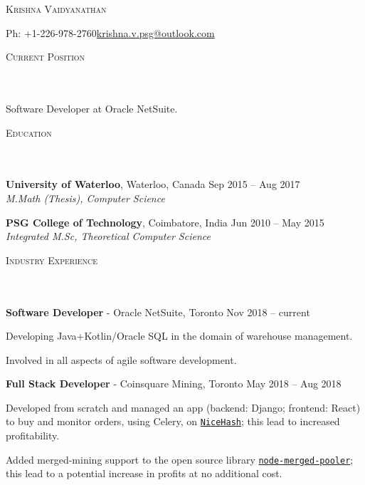 \documentclass{article}
\newcommand{\header}[1]{{
\hspace*{-15pt}\vspace*{6pt} \textsc{#1}} \vspace*{-6pt} 
\lineunder
}
\newcommand{\lineunder}{
\vspace*{-8pt} \\ \hspace*{-18pt} 
\hrulefill \\
}
\newcommand{\content}{
\vspace*{2pt}%
}
\newcommand{\college}[5]{\vspace*{2pt}%
#1 \hfill #2 \\ #3 \hfill #4
\vspace*{5pt}
}
\newcommand{\employer}[4]{{
\vspace*{2pt}%
\textbf{#1} - #2 \hfill #3\\ #4 \vspace*{2pt}}
}
\renewcommand{\labelitemii}{
$\vcenter{\hbox{\tiny$\bullet$}}$\hspace*{-3pt}
}
\newenvironment{bullet-list-minor}{
\begin{list}{\labelitemii}{\setlength\leftmargin{15pt} 
\topsep 0pt \itemsep -2pt}}{\vspace*{4pt}\end{list}
}
\begin{document}
\small
\smallskip
\vspace*{-65pt}

\begin{center}
    {\large \scshape{Krishna Vaidyanathan}}
\end{center}
    Ph: +1-226-978-2760\hfill \href{mailto:krishna.v.psg@outlook.com}{krishna.v.psg@outlook.com} \\
\vspace{15pt}

\header{Current Position}
    \content{Software Developer at Oracle NetSuite.}


\vspace*{4pt}%
\header{Education}
    \college{\textbf{University of Waterloo}, Waterloo, Canada}{Sep 2015 -- Aug 2017}
    {\textit{M.Math (Thesis), Computer Science}}{}\\

    \college{\textbf{PSG College of Technology}, Coimbatore, India}{Jun 2010 -- May 2015}
    {\textit{Integrated M.Sc, Theoretical Computer Science}}{}\\

\vspace*{4pt}%
\header{Industry Experience}
  \employer{Software Developer}{Oracle NetSuite,
        Toronto}{Nov 2018 -- current}{}
	\begin{bullet-list-minor}
	\item Developing Java+Kotlin/Oracle SQL in the domain of warehouse management.
	\item Involved in all aspects of agile software development.
    \end{bullet-list-minor}

    \employer{Full Stack Developer}{Coinsquare Mining,
        Toronto}{May 2018 -- Aug 2018}{}
	\begin{bullet-list-minor}
	\item Developed from scratch and managed an app (backend: Django; frontend: React) to buy and monitor
orders, using Celery, on \texttt{\href{www.nicehash.com}{NiceHash}};  this lead to increased profitability. 
	\item Added merged-mining support to the open source library \texttt{\href{https://github.com/UNOMP/node-merged-pool}{node-merged-pooler}}; this lead to a potential increase in profits at no additional cost.
    \end{bullet-list-minor}
\end{document}
